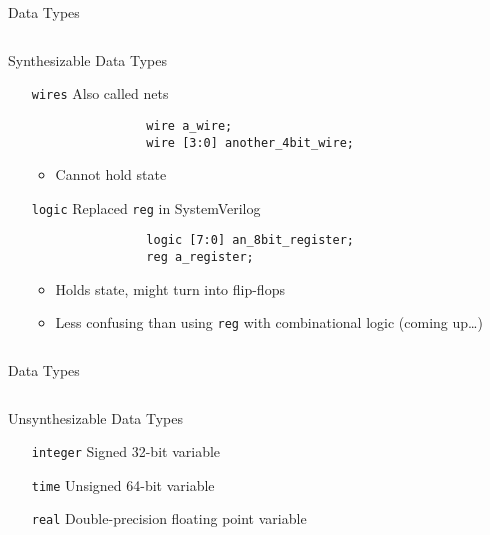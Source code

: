 \documentclass[table,dvipsnames,colorlinks=true]{beamer}
\begin{document}
\begin{frame}[fragile]{Data Types}
    \begin{columns}
        \begin{column}[T]{0.85\textwidth}
            \begin{block}{Synthesizable Data Types}
                \begin{itemize}
                    \item[\texttt{wires}] Also called nets
                        \begin{verbatim}
                wire a_wire;
                wire [3:0] another_4bit_wire;
                        \end{verbatim}
                        \begin{itemize}
                            \item Cannot hold state
                        \end{itemize}
                    \item[\texttt{logic}] Replaced \texttt{reg} in SystemVerilog
                        \begin{verbatim}
                logic [7:0] an_8bit_register;    
                reg a_register;
                        \end{verbatim}
                        \begin{itemize}
                            \item Holds state, might turn into flip-flops
                            \item Less confusing than using \texttt{reg} with
                                combinational logic (coming up\dots)
                        \end{itemize}
                \end{itemize}
            \end{block}
        \end{column}
    \end{columns}
\end{frame}

\begin{frame}{Data Types}
    \begin{columns}
        \begin{column}[T]{0.85\textwidth}
            \begin{block}{Unsynthesizable Data Types}
                \begin{itemize}
                    \item[\texttt{integer}] Signed 32-bit variable
                    \item[\texttt{time}] Unsigned 64-bit variable
                    \item[\texttt{real}] Double-precision floating point variable
                \end{itemize}
            \end{block}
        \end{column}
    \end{columns}
\end{frame}
\end{document}
